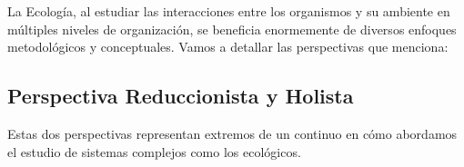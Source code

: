 \documentclass[
]{book}
\begin{document}
La Ecología, al estudiar las interacciones entre los organismos y su ambiente en múltiples niveles de organización, se beneficia enormemente de diversos enfoques metodológicos y conceptuales. Vamos a detallar las perspectivas que menciona:

\subsection*{\texorpdfstring{\textbf{Perspectiva Reduccionista y Holista}}{Perspectiva Reduccionista y Holista}}\label{reducholism}

Estas dos perspectivas representan extremos de un continuo en cómo abordamos el estudio de sistemas complejos como los ecológicos.
\end{document}
